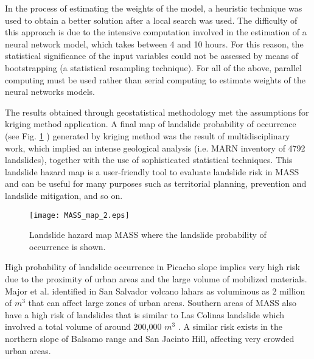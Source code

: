 \documentclass[11pt,twoside]{rmta2010eng}%
\begin{document}
In the process of estimating the weights of the model, a heuristic technique was used to obtain a better solution after a local search was used. The difficulty of this approach is due to the intensive computation involved in the estimation of a neural network model, which takes between 4 and 10 hours. For this reason, the statistical significance of the input variables could not be assessed by means of bootstrapping (a statistical resampling technique). For all of the above, parallel computing must be used rather than serial computing to estimate weights of the neural networks models.



The results obtained through geostatistical methodology met the assumptions for kriging method application. A final map of landslide probability of occurrence (see Fig. \ref{fig:mass02} ) generated by kriging method was the result of multidisciplinary work, which implied an intense geological analysis (i.e. MARN inventory of 4792 landslides), together with the use of sophisticated statistical techniques. This landslide hazard map is a user-friendly tool to evaluate landslide risk in MASS and can be useful for many purposes such as territorial planning, prevention and landslide mitigation, and so on. 
\begin{center}
  \begin{figure}
   \centering
   \texttt{[image: MASS\_map\_2.eps]}
   \caption{\small{Landslide hazard map MASS where the landslide probability of occurrence is shown.}}
   \label{fig:mass02}
  \end{figure}
 \end{center}
High probability of landslide occurrence in Picacho slope implies very high risk due to the proximity of urban areas and the large volume of mobilized materials. Major et al.\cite{major2004} identified in San Salvador volcano lahars as voluminous as 2 million of $m^{3}$ that can affect large zones of urban areas. Southern areas of MASS also have a high risk of landslides that is similar to Las Colinas landslide which involved a total volume of around 200,000 $m^{3}$ \cite{evans}. A similar risk exists in the northern slope of Balsamo range and San Jacinto Hill, affecting very crowded urban areas.
\end{document}
